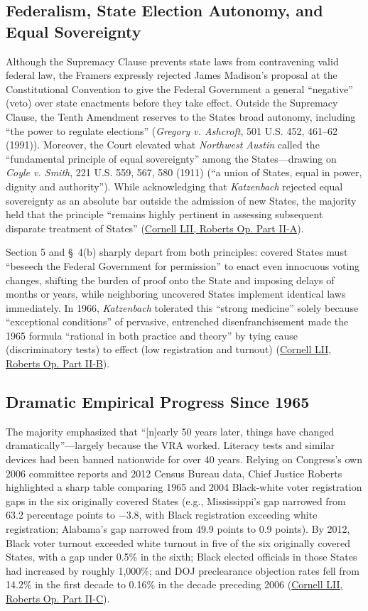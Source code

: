 \documentclass[12pt]{article}
\begin{document}
\subsection{Federalism, State Election Autonomy, and Equal Sovereignty}
Although the Supremacy Clause prevents state laws from contravening valid federal law, the Framers expressly rejected James Madison's proposal at the Constitutional Convention to give the Federal Government a general ``negative'' (veto) over state enactments before they take effect. Outside the Supremacy Clause, the Tenth Amendment reserves to the States broad autonomy, including ``the power to regulate elections'' (\emph{Gregory v. Ashcroft}, 501 U.S. 452, 461--62 (1991)). Moreover, the Court elevated what \emph{Northwest Austin} called the ``fundamental principle of equal sovereignty'' among the States---drawing on \emph{Coyle v. Smith}, 221 U.S. 559, 567, 580 (1911) (``a union of States, equal in power, dignity and authority''). While acknowledging that \emph{Katzenbach} rejected equal sovereignty as an absolute bar outside the admission of new States, the majority held that the principle ``remains highly pertinent in assessing subsequent disparate treatment of States'' (\href{https://www.law.cornell.edu/supremecourt/text/12-96}{Cornell LII, Roberts Op. Part II-A}).

Section 5 and \S~4(b) sharply depart from both principles: covered States must ``beseech the Federal Government for permission'' to enact even innocuous voting changes, shifting the burden of proof onto the State and imposing delays of months or years, while neighboring uncovered States implement identical laws immediately. In 1966, \emph{Katzenbach} tolerated this ``strong medicine'' solely because ``exceptional conditions'' of pervasive, entrenched disenfranchisement made the 1965 formula ``rational in both practice and theory'' by tying cause (discriminatory tests) to effect (low registration and turnout) (\href{https://www.law.cornell.edu/supremecourt/text/12-96}{Cornell LII, Roberts Op. Part II-B}).

\subsection{Dramatic Empirical Progress Since 1965}
The majority emphasized that ``[n]early 50 years later, things have changed dramatically''---largely because the VRA worked. Literacy tests and similar devices had been banned nationwide for over 40 years. Relying on Congress's own 2006 committee reports and 2012 Census Bureau data, Chief Justice Roberts highlighted a sharp table comparing 1965 and 2004 Black-white voter registration gaps in the six originally covered States (e.g., Mississippi's gap narrowed from 63.2 percentage points to $-3.8$, with Black registration exceeding white registration; Alabama's gap narrowed from 49.9 points to 0.9 points). By 2012, Black voter turnout exceeded white turnout in five of the six originally covered States, with a gap under 0.5\% in the sixth; Black elected officials in those States had increased by roughly 1,000\%; and DOJ preclearance objection rates fell from 14.2\% in the first decade to 0.16\% in the decade preceding 2006 (\href{https://www.law.cornell.edu/supremecourt/text/12-96}{Cornell LII, Roberts Op. Part II-C}).
\end{document}
